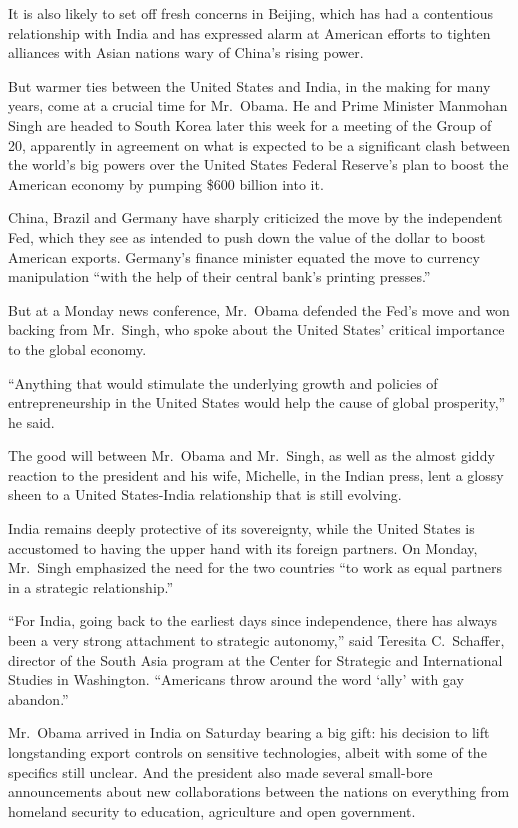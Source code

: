 ﻿\documentclass[12pt]{article}
\begin{document}
It is also likely to set off fresh concerns in Beijing, which has had a contentious relationship
with India and has expressed alarm at American efforts to tighten alliances with Asian nations wary
of China's rising power.

But warmer ties between the United States and India, in the making for many years, come at a crucial
time for Mr.~Obama. He and Prime Minister Manmohan Singh are headed to South Korea later this week
for a meeting of the Group of 20, apparently in agreement on what is expected to be a significant
clash between the world's big powers over the United States Federal Reserve's plan to boost the
American economy by pumping \$600 billion into it.

China, Brazil and Germany have sharply criticized the move by the independent Fed, which they see as
intended to push down the value of the dollar to boost American exports. Germany's finance minister
equated the move to currency manipulation ``with the help of their central bank's printing
presses.''

But at a Monday news conference, Mr.~Obama defended the Fed's move and won backing from Mr.~Singh,
who spoke about the United States' critical importance to the global economy.

``Anything that would stimulate the underlying growth and policies of entrepreneurship in the United
States would help the cause of global prosperity,'' he said.

The good will between Mr.~Obama and Mr.~Singh, as well as the almost giddy reaction to the president
and his wife, Michelle, in the Indian press, lent a glossy sheen to a United States-India
relationship that is still evolving.

India remains deeply protective of its sovereignty, while the United States is accustomed to having
the upper hand with its foreign partners. On Monday, Mr.~Singh emphasized the need for the two
countries ``to work as equal partners in a strategic relationship.''

``For India, going back to the earliest days since independence, there has always been a very strong
attachment to strategic autonomy,'' said Teresita C.~Schaffer, director of the South Asia program at
the Center for Strategic and International Studies in Washington. ``Americans throw around the word
`ally' with gay abandon.''

Mr.~Obama arrived in India on Saturday bearing a big gift: his decision to lift longstanding export
controls on sensitive technologies, albeit with some of the specifics still unclear. And the
president also made several small-bore announcements about new collaborations between the nations on
everything from homeland security to education, agriculture and open government.
\end{document}
